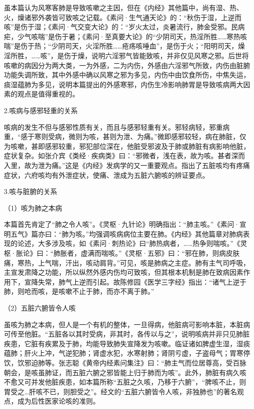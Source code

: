 \documentclass[draft,12pt]{ctexbook}
\begin{document}
虽本篇认为风寒客肺是导致咳嗽之主因，但在《内经》其他篇中，尚有湿、热、火，燥诸邪外袭皆可致咳之记载。《素问·生气通天论》的：“秋伤于湿，上逆而咳”是伤于湿；《素问·气交变大论》的：“岁火太过，炎暑流行，肺金受邪。民病疟，少气咳喘”是伤于暑；《素问·至真要大论》的“少阴司天，热淫所胜……寒热咳喘”是伤于热；“少阴司天，火淫所胜……疮疡咳唾血”，是伤于火；“阳明司天，燥淫所胜，……咳”，是伤于燥，说明六淫邪气皆能致咳，并非仅见风寒之邪。后世将咳嗽的病因分为两大类，一为外感，二为内伤，外感由六淫邪气所致，内伤由脏腑功能失调所致，其中外感中确以风寒之邪为多见，内伤中由饮食所伤，中焦失运，痰湿蕴肺为多见，说明本篇提出的外感寒邪，内伤生冷影响肺胃是导致咳病两大因素的观点是值得重视的。

2.咳病与感邪轻重的关系

咳病的发生不但与感邪性质有关，而且与感邪轻重有关。邪轻病轻，邪重病重，“感于寒则受病，微则为咳，甚则为泄、为痛。”微即感邪较轻，病在肺脏，仅为咳嗽，甚即感邪较重，邪犯部位深在，他脏受邪波及于肺或肺脏有病影响他脏，症状复杂。如张介宾《类经·疾病类》曰：“邪微者，浅在表，故为咳。甚者深而入里，故为泄为痛。”这是《内经》发病学的又一重要观点。指出了五脏咳均有疼痛症状，六府咳均有外泄症状，使痛、泄成为五脏六腑咳的辨证要点。

3.咳与脏腑的关系

（1）咳为肺之本病

本篇首先肯定了“肺之令人咳”。《灵枢·九针论》明确指出：“肺主咳。”《素问·宣明五气》篇亦曰：“肺为咳。”均强调咳病病位主要在肺。《内经》其他篇章对肺病表现的论述，大多涉及咳，如《素问·刺热论》曰“肺热病者，……热争则喘咳。”《灵枢·胀论》曰：“肺胀者，虚满而喘咳。”《灵枢·五邪》曰：“邪在肺，则病皮肤痛，寒热，上气喘，汗出，咳动肩背。”可见，咳是肺病之主症。肺有主气司呼吸，主宣发肃降之功能，所以纵然外感内伤均可致咳，但其根本机制是肺在致病因素作用下，宣降失常，肺气上逆而引起。故陈修园《医学三字经》指出：“诸气上逆于肺，则呛而咳，是咳嗽不止于肺，而亦不离于肺。”

（2）五脏六腑皆令人咳

虽咳为肺之本病，但人是一个有机的整体，一旦得病，他脏病可影响本脏，本脏病可传至他脏。“五脏各以其时受病，非其时，各传以与之”，说明咳病并非只见肺脏疾患，它脏有疾累及于肺，均能导致肺失宣降发为咳嗽。临证诸如脾虚生湿，湿痰蕴肺；肝火上冲，气逆犯肺；肾虚水犯，水寒射肺；肾阴亏虚，子盗母气；胃寒停饮，饮邪迫肺等。张志聪《黄帝内经素问集注》曰：“肺主气而位居尊高，受百脉朝会，是咳虽肺证，而五脏六腑之邪皆能上归于肺而为咳”。此外，肺脏有病久咳不愈又可并发他脏疾患，如本篇所称“五脏之久咳，乃移于六腑”，“脾咳不止，则胃受之…肝咳不已，则胆受之”。经文的“五脏六腑皆令人咳，非独肺也”的著名观点，成为后性医家论咳的准则。
\end{document}
